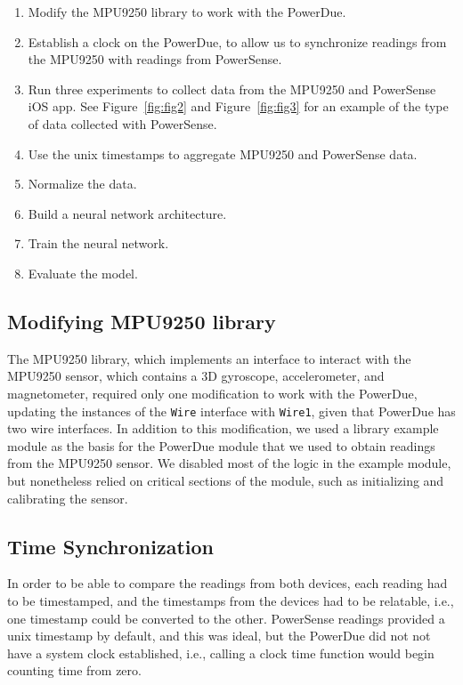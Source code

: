 \documentclass[journal]{IEEEtranTIE}
\begin{document}
\begin{enumerate}
\item Modify the MPU9250 library to work with the PowerDue.
\item Establish a clock on the PowerDue, to allow us to synchronize readings
      from the MPU9250 with readings from PowerSense.
\item Run three experiments to collect data from the MPU9250 and PowerSense iOS
      app. See Figure~\ref{fig:fig2} and Figure~\ref{fig:fig3} for an example of
      the type of data collected with PowerSense.
\item Use the unix timestamps to aggregate MPU9250 and PowerSense data.
\item Normalize the data.
\item Build a neural network architecture.
\item Train the neural network.
\item Evaluate the model.
\end{enumerate}

\subsection{Modifying MPU9250 library}

The MPU9250 library, which implements an interface to interact with the MPU9250
sensor, which contains a 3D gyroscope, accelerometer, and magnetometer, required
only one modification to work with the PowerDue, updating the instances of the
\texttt{Wire} interface with \texttt{Wire1}, given that PowerDue has two wire
interfaces. In addition to this modification, we used a library example module
\cite{MPU9250Ex} as the basis for the PowerDue module that we used to obtain
readings from the MPU9250 sensor. We disabled most of the logic in the example
module, but nonetheless relied on critical sections of the module, such as
initializing and calibrating the sensor.

\subsection{Time Synchronization}

In order to be able to compare the readings from both devices, each reading had
to be timestamped, and the timestamps from the devices had to be relatable,
i.e., one timestamp could be converted to the other. PowerSense readings
provided a unix timestamp by default, and this was ideal, but the PowerDue did
not not have a system clock established, i.e., calling a clock time function
would begin counting time from zero.
\end{document}
